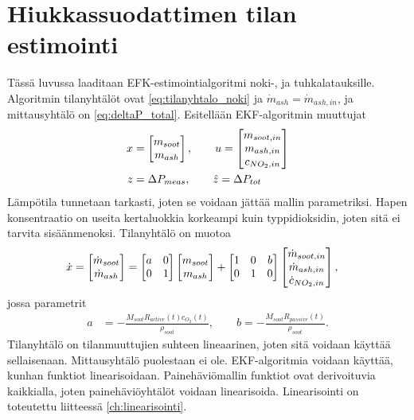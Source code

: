 \chapter{Hiukkassuodattimen tilan estimointi}%
\label{ch:dpf_estimointi}


Tässä luvussa laaditaan EFK-estimointialgoritmi noki-, ja tuhkalatauksille. Algoritmin tilanyhtälöt ovat \eqref{eq:tilanyhtalo_noki} ja \(\dot{m}_{ash} =\dot{m}_{ash,in}\), ja mittausyhtälö on \eqref{eq:deltaP_total}. 
Esitellään EKF-algoritmin muuttujat
\begin{align*}
    x &= \begin{bmatrix} m_{soot} \\ m_{ash} \end{bmatrix},  
    \qquad  u = \begin{bmatrix} m_{soot, in} \\ m_{ash,in} \\ c_{NO_2, in} \end{bmatrix} 
    \\
    z &= \Delta P_{meas},
    \qquad \hat{z} =  \Delta P_{tot} \\
\end{align*}
Lämpötila tunnetaan tarkasti, joten se voidaan jättää mallin parametriksi. Hapen konsentraatio on useita kertaluokkia korkeampi kuin typpidioksidin, joten sitä ei tarvita sisäänmenoksi. Tilanyhtälö on muotoa
\begin{align}
    \dot{x} = \begin{bmatrix} \dot{m}_{soot} \\ \dot{m}_{ash} \end{bmatrix} &=
    \begin{bmatrix} a &0 \\0 & 1 \end{bmatrix} \begin{bmatrix} m_{soot} \\ m_{ash} \end{bmatrix} + 
    \begin{bmatrix} 1 & 0 & b\\ 0 & 1 & 0 \end{bmatrix} \begin{bmatrix} \dot{m}_{soot, in} \\ \dot{m}_{ash, in} \\ \dot{c}_{NO_2, in} \end{bmatrix},
\end{align}
jossa parametrit
\begin{align*}
    a &= -\frac{M_{soot}R_{active}(t)c_{O_2}(t)}{\rho_{soot}}, \qquad b = -\frac{M_{soot}R_{passive}(t)}{{\rho_{soot}}}.
\end{align*}
Tilanyhtälö on tilanmuuttujien suhteen lineaarinen, joten sitä voidaan käyttää sellaisenaan. Mittausyhtälö puolestaan ei ole. 
EKF-algoritmia voidaan käyttää, kunhan funktiot linearisoidaan. 
Painehäviömallin funktiot ovat derivoituvia kaikkialla, joten painehäviöyhtälöt voidaan linearisoida.
Linearisointi on toteutettu liitteessä \ref{ch:linearisointi}.